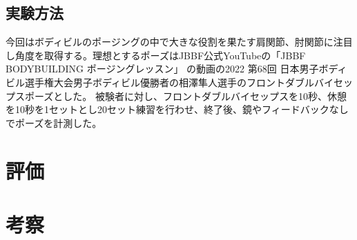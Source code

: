 \documentclass[a4j,10pt]{jsarticle}
\begin{document}
\subsection{実験方法}
今回はボディビルのポージングの中で大きな役割を果たす肩関節、肘関節に注目し角度を取得する。理想とするポーズはJBBF公式YouTubeの「JBBF　BODYBUILDING ポージングレッスン」\cite{aizawa}
の動画の2022 第68回 日本男子ボディビル選手権大会男子ボディビル優勝者の相澤隼人選手のフロントダブルバイセップスポーズとした。
被験者に対し、フロントダブルバイセップスを10秒、休憩を10秒を1セットとし20セット練習を行わせ、終了後、鏡やフィードバックなしでポーズを計測した。
\section{評価}

\section{考察}



\end{document}
